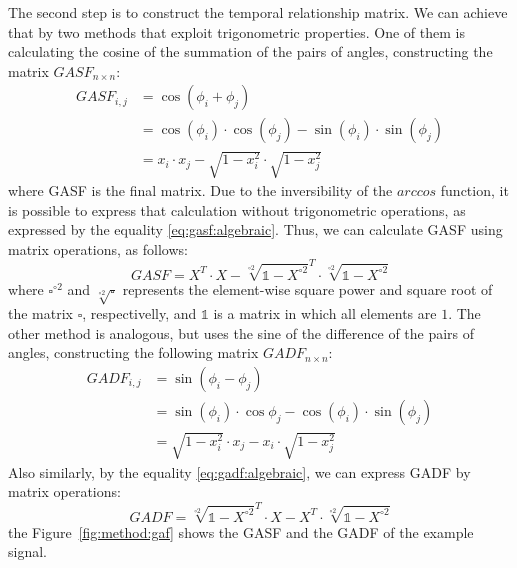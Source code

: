

The second step is to construct the temporal relationship matrix. We can achieve that by two methods that exploit trigonometric properties. One of them is calculating the cosine of the summation of the pairs of angles, constructing the matrix $GASF_{n \times n}$:
\begin{align}
    GASF_{i,j}     & = \cos(\phi_i + \phi_j) \\
            & = \cos(\phi_i) \cdot \cos(\phi_j) - \sin(\phi_i) \cdot \sin(\phi_j) \\
            & = x_i \cdot x_j - \sqrt{1 - x_i^2} \cdot \sqrt{1 - x_j^2} \label{eq:gasf:algebraic}
\end{align}
\noindent where \gls{GASF} is the final matrix. Due to the inversibility of the $arccos$ function, it is possible to express that calculation without trigonometric operations, as expressed by the equality \ref{eq:gasf:algebraic}. Thus, we can calculate \gls{GASF} using matrix operations, as follows:  
\begin{equation}
    GASF = X^T \cdot X - \sqrt[\circ 2]{\mathds{1}-X^{\circ 2}}^T \cdot \sqrt[\circ 2]{\mathds{1}-X^{\circ 2}}
\end{equation}
\noindent where $\square^{\circ 2}$ and $\sqrt[\circ 2]{\square}$ represents the element-wise square power and square root of the matrix $\square$, respectivelly, and $\mathds{1}$ is a matrix in which all elements are $1$. The other method is analogous, but uses the sine of the difference of the pairs of angles, constructing the following matrix $GADF_{n \times n}$:
\begin{align}
    GADF_{i,j} & = \sin(\phi_i - \phi_j) \\
        & = \sin(\phi_i) \cdot \cos{\phi_j} - \cos(\phi_i) \cdot \sin(\phi_j) \\
        & = \sqrt{1 - x_i^2} \cdot x_j - x_i \cdot \sqrt{1 - x_j^2}  \label{eq:gadf:algebraic}
\end{align}
\noindent Also similarly, by the equality \ref{eq:gadf:algebraic}, we can express \gls{GADF} by matrix operations:
\begin{equation}
    GADF = \sqrt[\circ 2]{\mathds{1} - X^{\circ 2}}^T \cdot X - X^T \cdot \sqrt[\circ 2]{\mathds{1} - X^{\circ 2}}
\end{equation}
\noindent the Figure~\ref{fig:method:gaf} shows the \gls{GASF} and the \gls{GADF} of the example signal.



